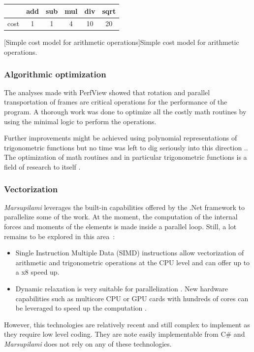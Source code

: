 \begin{table}[!b]
\center
	\begin{tabularx}{0.4\textwidth}{@{} X ccccc @{}}
		\toprule
		 	& add 	& sub 	& mul 	& div 	& sqrt \\
		\midrule
		cost	& 1 		& 1 		& 4 		& 10 		& 20	\\
		\bottomrule
	\end{tabularx}
	\label{tab:count}
	\vspace{10pt}
	[Simple cost model for arithmetic operations]{Simple cost model for arithmetic operations.}
	\label{tab:costmodel}
\end{table}

\subsubsection{Algorithmic optimization}
The analyses made with PerfView showed that rotation and parallel transportation of frames are critical operations for the performance of the program. A thorough work was done to optimize all the costly math routines by using the minimal logic to perform the operations.

Further improvements might be achieved using polynomial representations of trigonometric functions but no time was left to dig seriously into this direction \cite{Trefethen2007,Chevillard2010}.\cite{Green2003}. The optimization of math routines and in particular trigonometric functions is a field of research to itself \cite{Green2003}.

\subsubsection{Vectorization}
\emph{Marsupilami} leverages the built-in capabilities offered by the .Net framework to parallelize some of the work. At the moment, the computation of the internal forces and moments of the elements is made inside a parallel loop. Still, a lot remains to be explored in this area~:
\begin{itemize}
\item Single Instruction Multiple Data (SIMD) instructions allow vectorization of arithmetic and trigonometric operations at the CPU level and can offer up to a x8 speed up.
\item Dynamic relaxation is very suitable for parallelization \cite{Topping1994}. New hardware capabilities such as multicore CPU or GPU cards with hundreds of cores can be leveraged to speed up the computation \cite{Rek2016,Liew2016}.
\end{itemize}
However, this technologies are relatively recent and still complex to implement as they require low level coding. They are note easily implementable from C\# and \emph{Marsupilami} does not rely on any of these technologies.

